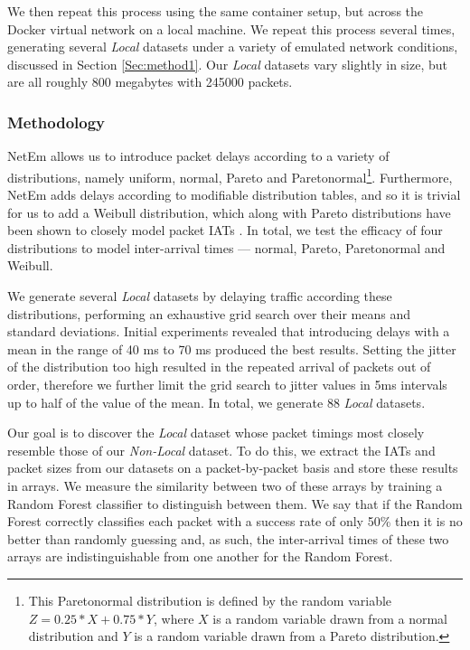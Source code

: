 We then repeat this process using the same container setup, but across the Docker virtual network on a local machine. We repeat this process several times, generating several \textit{Local} datasets under a variety of emulated network conditions, discussed in Section \ref{Sec:method1}. Our \textit{Local} datasets vary slightly in size, but are all roughly 800 megabytes with 245000 packets. %


\subsubsection*{Methodology}
\label{Sec:method1}


NetEm allows us to introduce packet delays according to a variety of distributions, namely uniform, normal, Pareto and Paretonormal\footnote{This Paretonormal distribution is defined by the random variable $Z = 0.25*X + 0.75*Y$, where $X$ is a random variable drawn from a normal distribution and $Y$ is a random variable drawn from a Pareto distribution.}. Furthermore, NetEm adds delays according to modifiable distribution tables, and so it is trivial for us to add a Weibull distribution, which along with Pareto distributions have been shown to closely model packet IATs \cite{arfeen2013role,paxson1995wide}.
In total, we test the efficacy of four distributions to model inter-arrival times --- normal, Pareto, Paretonormal and Weibull. 
 
We generate several \textit{Local} datasets by delaying traffic according these distributions, performing an exhaustive grid search over their means and standard deviations. Initial experiments revealed that introducing delays with a mean in the range of 40 ms to 70 ms produced the best results. Setting the jitter of the distribution too high resulted in the repeated arrival of packets out of order, therefore we further limit the grid search to jitter values in 5ms intervals up to half of the value of the mean. In total, we generate 88 \textit{Local} datasets.

Our goal is to discover the \textit{Local} dataset whose packet timings most closely resemble those of our \textit{Non-Local} dataset. To do this, we extract the IATs and packet sizes from our datasets on a packet-by-packet basis and store these results in arrays. We measure the similarity between two of these arrays by training a Random Forest classifier to distinguish between them. We say that if the Random Forest correctly classifies each packet with a success rate of only 50\% then it is no better than randomly guessing and, as such, the inter-arrival times of these two arrays are indistinguishable from one another for the Random Forest.

